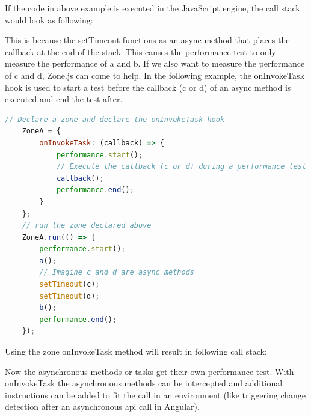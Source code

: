 If the code in above example is executed in the JavaScript engine, the call stack would look as following: 


This is because the setTimeout functions as an async method that places the callback at the end of the stack. This causes the performance test to only measure the performance of a and b. If we also want to measure the performance of c and d, Zone.js can come to help. In the following example, the onInvokeTask hook is used to start a test before the callback (c or d) of an async method is executed and end the test after.

\begin{lstlisting}[language=Javascript]
	// Declare a zone and declare the onInvokeTask hook
	ZoneA = {
		onInvokeTask: (callback) => {
			performance.start();
			// Execute the callback (c or d) during a performance test
			callback();
			performance.end();
		}	
	};
	// run the zone declared above
	ZoneA.run(() => {
		performance.start();
		a();
		// Imagine c and d are async methods
		setTimeout(c);
		setTimeout(d);
		b();
		performance.end();
	});
\end{lstlisting}
\autocite{ngHouston2019}
Using the zone onInvokeTask method will result in following call stack:


Now the asynchronous methods or tasks get their own performance test.
With onInvokeTask the asynchronous methods can be intercepted and additional instructions can be added to fit the call in an environment (like triggering change detection after an asynchronous api call in Angular).
\autocite{ngHouston2019}

